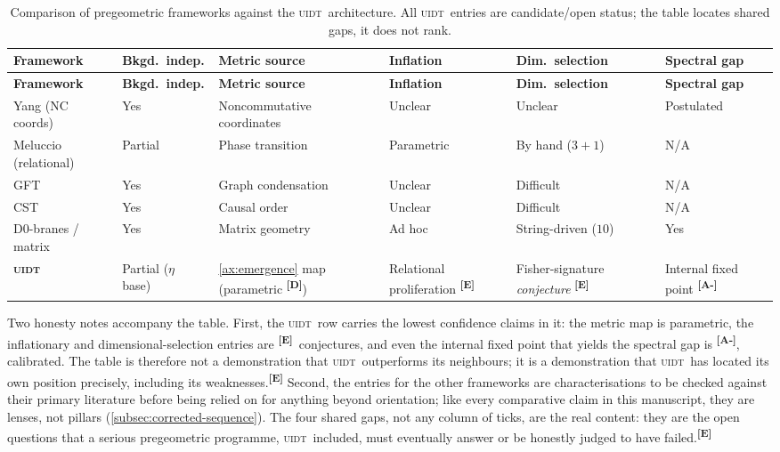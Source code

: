 \documentclass[12pt,a4paper,twoside]{article}
\theoremstyle{plain}
\theoremstyle{definition}
\theoremstyle{remark}
\newcommand{\UIDT}{\textsc{uidt}}
\newcommand{\catmark}[1]{\textsuperscript{\textsf{\textbf{[#1]}}}}
\begin{document}
{\small
\renewcommand{\arraystretch}{1.25}
\begin{longtable}{p{} p{} p{} p{} p{} p{}}
\caption{Comparison of pregeometric frameworks against the \UIDT\ architecture.
All \UIDT\ entries are candidate/open status; the table locates shared gaps, it
does not rank.}
\label{tab:pregeometric-comparison}\\
\toprule
\textbf{Framework} & \textbf{Bkgd.\ indep.} & \textbf{Metric source} & \textbf{Inflation} & \textbf{Dim.\ selection} & \textbf{Spectral gap} \\
\midrule
\endfirsthead
\toprule
\textbf{Framework} & \textbf{Bkgd.\ indep.} & \textbf{Metric source} & \textbf{Inflation} & \textbf{Dim.\ selection} & \textbf{Spectral gap} \\
\midrule
\endhead
\bottomrule
\endfoot
Yang (NC coords) & Yes & Noncommutative coordinates & Unclear & Unclear & Postulated \\
Meluccio (relational) & Partial & Phase transition & Parametric & By hand ($3{+}1$) & N/A \\
GFT & Yes & Graph condensation & Unclear & Difficult & N/A \\
CST & Yes & Causal order & Unclear & Difficult & N/A \\
D0-branes / matrix & Yes & Matrix geometry & Ad hoc & String-driven ($10$) & Yes \\
\midrule
\textbf{\UIDT} & Partial ($\eta$ base) & \cref{ax:emergence} map (parametric \catmark{D}) & Relational proliferation \catmark{E} & Fisher-signature \emph{conjecture} \catmark{E} & Internal fixed point \catmark{A-} \\
\bottomrule
\end{longtable}
}

\noindent Two honesty notes accompany the table. First, the \UIDT\ row carries the lowest confidence claims in it: the metric map is parametric, the inflationary and dimensional-selection entries are \catmark{E}\ conjectures, and even the internal fixed point that yields the spectral gap is \catmark{A-}, calibrated. The table is therefore not a demonstration that \UIDT\ outperforms its neighbours; it is a demonstration that \UIDT\ has located its own position precisely, including its weaknesses.\catmark{E} Second, the entries for the other frameworks are characterisations to be checked against their primary literature before being relied on for anything beyond orientation; like every comparative claim in this manuscript, they are lenses, not pillars (\cref{subsec:corrected-sequence}). The four shared gaps, not any column of ticks, are the real content: they are the open questions that a serious pregeometric programme, \UIDT\ included, must eventually answer or be honestly judged to have failed.\catmark{E}
\end{document}
